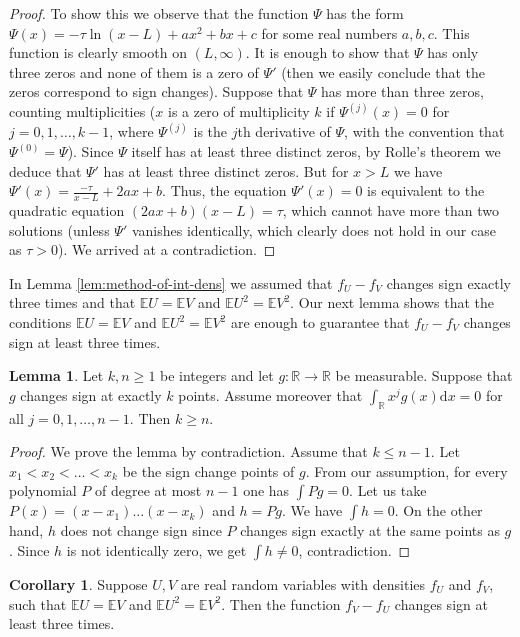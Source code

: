\documentclass[11pt]{amsart}
\newcommand{\dd}{\mathrm{d}}
\newcommand{\1}{\mathbf{1}}
\newcommand{\R}{\mathbb{R}}
\newcommand{\E}{\mathbb{E}}
\theoremstyle{definition}
\newtheorem{cor}{Corollary}
\newtheorem{lemma}{Lemma}
\theoremstyle{definition}
\theoremstyle{remark}
\begin{document}
\begin{proof}
To show this we observe that the function $\Psi$ has the form $\Psi(x)= -\tau \ln(x-L)+ax^2+bx+c$ for some real numbers $a,b,c$. This function is clearly smooth on $(L,\infty)$. It is enough to show that $\Psi$ has only three zeros and none of them is a zero of $\Psi'$ (then we easily conclude that the zeros correspond to sign changes). Suppose that $\Psi$ has more than three zeros, counting multiplicities ($x$ is a zero of multiplicity $k$ if $\Psi^{(j)}(x)=0$ for $j=0,1,\ldots, k-1$, where $\Psi^{(j)}$ is the $j$th derivative of $\Psi$, with the convention that $\Psi^{(0)}=\Psi$). Since $\Psi$ itself has at least three distinct zeros, by Rolle's theorem we deduce that $\Psi'$ has at least three distinct zeros. But for $x>L$ we have
$
	\Psi'(x) = \frac{-\tau}{x-L} + 2ax+b.
$
Thus, the equation $\Psi'(x)=0$ is equivalent to the quadratic equation $(2 a x + b)(x-L)=\tau$, which cannot have more than two solutions (unless $\Psi'$ vanishes identically, which clearly  does not hold in our case as $\tau>0$). We arrived at a contradiction.
\end{proof}

\noindent In Lemma \ref{lem:method-of-int-dens} we assumed that $f_U-f_V$ changes sign exactly three times and that $\E U= \E V$ and $\E U^2 = \E V^2$. Our next lemma shows that the conditions $\E U= \E V$ and $\E U^2 = \E V^2$ are enough to guarantee that $f_U-f_V$ changes sign at least three times. 

\begin{lemma}\label{lem:interlacing}
Let $k,n \geq 1$ be integers and let $g: \R \to \R$ be measurable. Suppose that $g$ changes sign at exactly $k$ points. Assume moreover that $\int_{\R} x^j g(x) \dd x = 0$ for all $j=0,1,\ldots, n-1$. Then $k \geq n$.   
\end{lemma}

\begin{proof}
We prove the lemma by contradiction. Assume that $k \leq n-1$. Let $x_1< x_2 < \ldots < x_k$ be the sign change points of $g$. From our assumption, for every polynomial $P$ of degree at most $n-1$ one has $\int Pg=0$. Let us take $P(x)=(x-x_1)\ldots(x-x_k)$ and  $h=Pg$. We have $\int h  = 0$. On the other hand, $h$ does not change sign since $P$ changes sign exactly at the same points as $g$. Since $h$ is not identically zero, we get $\int h \ne 0$,  contradiction. 
\end{proof}

\begin{cor}\label{cor:three-times}
Suppose $U,V$ are real random variables with densities $f_U$ and $f_V$, such that $\E U= \E V$ and $\E U^2= \E V^2$. Then the function $f_V-f_U$ changes sign at least three times.
\end{cor}
\end{document}
